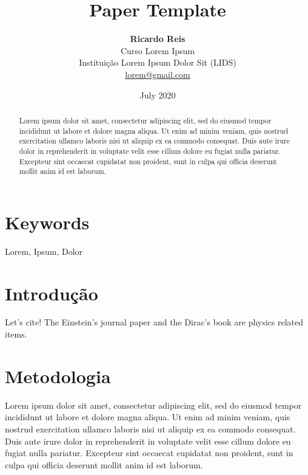\documentclass[10pt, a4paper,twocolumn]{article}
\title{
    \textbf{Paper Template} %
    }
\author{
    \textbf{Ricardo Reis} \\
    {\small Curso Lorem Ipsum} \\ %
    {\small Instituição Lorem Ipsum Dolor Sit (LIDS)} \\
    {\small \href{mailto:lorem@gmail.com}{lorem@gmail.com }}
    }
\date{July 2020}
\begin{document}
\maketitle

\begin{abstract}
Lorem ipsum dolor sit amet, consectetur adipiscing elit, sed do eiusmod tempor incididunt ut labore et dolore magna aliqua. Ut enim ad minim veniam, quis nostrud exercitation ullamco laboris nisi ut aliquip ex ea commodo consequat. Duis aute irure dolor in reprehenderit in voluptate velit esse cillum dolore eu fugiat nulla pariatur. Excepteur sint occaecat cupidatat non proident, sunt in culpa qui officia deserunt mollit anim id est laborum.
\end{abstract}

\section*{Keywords}
Lorem, Ipsum, Dolor

\section{Introdução}
Let's cite! The Einstein's journal paper \cite{einstein} and the Dirac's 
book \cite{dirac} are physics related items. 

\section{Metodologia}
Lorem ipsum dolor sit amet, consectetur adipiscing elit, sed do eiusmod tempor incididunt ut labore et dolore magna aliqua. Ut enim ad minim veniam, quis nostrud exercitation ullamco laboris nisi ut aliquip ex ea commodo consequat. Duis aute irure dolor in reprehenderit in voluptate velit esse cillum dolore eu fugiat nulla pariatur. Excepteur sint occaecat cupidatat non proident, sunt in culpa qui officia deserunt mollit anim id est laborum.
\end{document}
